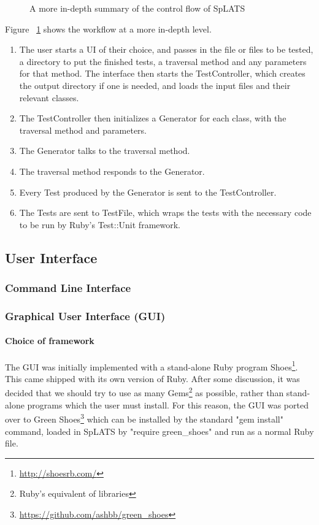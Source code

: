   \begin{center}
  \begin{figure}
  
  \caption{A more in-depth summary of the control flow of SpLATS}
  \label{fig:Architecture_LowLevel}
  \end{figure}
  \end{center}
  Figure ~\ref{fig:Architecture_LowLevel} shows the workflow at a more in-depth level.
  \begin{enumerate}
  \small
  \item The user starts a UI of their choice, and passes in the file or files to be tested, a directory to put the finished tests, a traversal method and any parameters for that method.
    The interface then starts the TestController, which creates the output directory if one is needed, and loads the input files and their relevant classes.
  \item The TestController then initializes a Generator for each class, with the traversal method and parameters.
  \item The Generator talks to the traversal method.
  \item The traversal method responds to the Generator.
  \item Every Test produced by the Generator is sent to the TestController.
  \item The Tests are sent to TestFile, which wraps the tests with the necessary code to be run by Ruby's Test::Unit framework.
  \end{enumerate}
  
  \subsection{User Interface}
  \setcounter{secnumdepth}{4}
  \subsubsection{Command Line Interface}
  \subsubsection{Graphical User Interface (GUI)}
  \paragraph{Choice of framework}
  The GUI was initially implemented with a stand-alone Ruby program Shoes\footnote{\url{http://shoesrb.com/}}. This came shipped with its own version of Ruby. After some discussion, it was decided that we should try to use as many Gems\footnote{Ruby's equivalent of libraries} as possible, rather than stand-alone programs which the user must install. For this reason, the GUI was ported over to Green Shoes\footnote{\url{https://github.com/ashbb/green_shoes}} which can be installed by the standard "gem install" command, loaded in SpLATS by "require green\_shoes" and run as a normal Ruby file.
  
